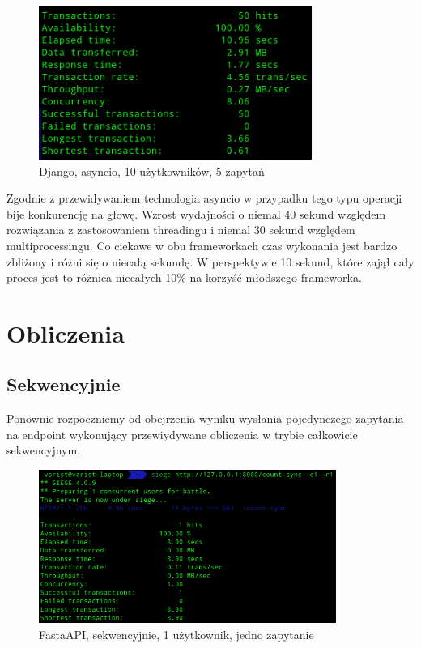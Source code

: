 \begin{figure}[H]
    \includegraphics[height=50mm]{zdjecia/10_req_asyncio_django}
    \centering
    \caption{Django, asyncio, 10 użytkowników, 5 zapytań}
\end{figure}
Zgodnie z przewidywaniem technologia asyncio w przypadku tego typu operacji bije konkurencję na głowę. Wzrost wydajności o niemal 40 sekund względem rozwiązania z zastosowaniem threadingu i niemal 30 sekund względem multiprocessingu. Co ciekawe w obu frameworkach czas wykonania jest bardzo zbliżony i różni się o niecałą sekundę. W perspektywie 10 sekund, które zajął cały proces jest to różnica niecałych 10\% na korzyść młodszego frameworka.

\section{Obliczenia}
\subsection{Sekwencyjnie}
Ponownie rozpoczniemy od obejrzenia wyniku wysłania pojedynczego zapytania na endpoint wykonujący przewiydywane obliczenia w trybie całkowicie sekwencyjnym.
\begin{figure}[H]
    \includegraphics[height=50mm]{zdjecia/1_math_sync_fast}
    \centering
    \caption{FastaAPI, sekwencyjnie, 1 użytkownik, jedno zapytanie}
\end{figure}

